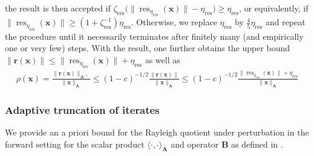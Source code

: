 \documentclass[a4paper,11pt,oneside]{amsart}
\providecommand{\norm}[1]{\lVert#1\rVert}
\theoremstyle{definition}
\theoremstyle{remark}
\newcommand{\A}{\ten A}
\newcommand{\ten}[1]{\boldsymbol{#1}}
\newcommand{\etares}{\eta_{\mathrm{res}}}
\newcommand{\zetares}{\zeta_{\mathrm{res}}}
\numberwithin{equation}{section}
\numberwithin{theorem}{section}
\begin{document}
the result is then accepted if $\zetares \big(\norm{ \operatorname{res}_{\etares}(\ten x)} - \etares \big) \geq \etares$, or equivalently, if $\norm{ \operatorname{res}_{\etares}(\ten x) }  \geq (1+\zetares^{-1}) \etares$. Otherwise, we replace $\etares$ by $\frac45 \etares$ and repeat the procedure until it necessarily terminates after finitely many (and empirically one or very few) steps. With the result, one further obtains the upper bound $\| \ten r(\ten x) \| \leq \norm{ \operatorname{res}_{\etares}(\ten x)}  + \etares$ as well as
\begin{align} \label{rhobound}
\rho(\ten x) = \frac{\|\ten r(\ten x)\|_{\ten A^{-1}}}{\|\ten x\|_{\ten A}} \leq 
(1-c)^{-1/2} \frac{\|\ten r(\ten x)\|}{\|\ten x\|_{\A}} \leq (1-c)^{-1/2} \frac{\norm{ \operatorname{res}_{\etares}(\ten x) } + \etares}{\|\ten x\|_{\A}}
\end{align}
%

\subsubsection{Adaptive truncation of iterates}\label{trunciter}

 We provide an a priori bound for the Rayleigh quotient under perturbation in the forward setting for the scalar product $\langle \cdot , \cdot \rangle_{\ten A}$ and operator $\ten B$ as defined in . 
\end{document}
